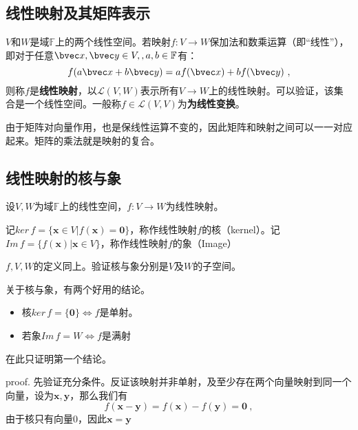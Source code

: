 
\begin{issues}
\issueDraft
\end{issues}
\subsection{线性映射及其矩阵表示}
$V$和$W$是域$\mathbb F$上的两个线性空间。若映射$f:V\rightarrow W$保加法和数乘运算（即“线性”），即对于任意$\bvec x,\bvec y \in V,,a,b\in\mathbb F$有：
\begin{equation}
f(a\bvec x+b\bvec y)=af(\bvec x)+bf(\bvec y)
~,\end{equation}
则称$f$是\textbf{线性映射}，以$\mathcal L(V,W)$表示所有$V\rightarrow W$上的线性映射。可以验证，该集合是一个线性空间。一般称$f\in \mathcal L(V,V)$为\textbf{为线性变换}。

由于矩阵对向量作用，也是保线性运算不变的，因此矩阵和映射之间可以一一对应起来。矩阵的乘法就是映射的复合。

\subsection{线性映射的核与象}

\begin{definition}{}
设$V,W$为域$\mathbb F$上的线性空间，$f:V\rightarrow W$为线性映射。

记$ker\,f=\{\boldsymbol x\in V|f(\boldsymbol x)=\boldsymbol 0\}$，称作线性映射$f$的核（kernel）。记$Im\,f=\{f(\boldsymbol x)|\boldsymbol x\in V\}$，称作线性映射$f$的象（Image）
\end{definition}
\begin{exercise}{}
$f,V,W$的定义同上。验证核与象分别是$V$及$W$的子空间。
\end{exercise}
关于核与象，有两个好用的结论。
\begin{itemize}
\item 核$ker\,f=\{\boldsymbol 0\}\Longleftrightarrow f$是单射。
\item 若象$Im\,f=W\Longleftrightarrow f$是满射
\end{itemize}
在此只证明第一个结论。

proof.
先验证充分条件。反证该映射并非单射，及至少存在两个向量映射到同一个向量，设为$\boldsymbol{x,y}$，那么我们有
\begin{equation}
f(\boldsymbol{x}-\boldsymbol{y})=f(\boldsymbol x)-f(\boldsymbol y)=\boldsymbol 0~,
\end{equation}
由于核只有向量$0$，因此$\boldsymbol {x}=\boldsymbol{y}$

